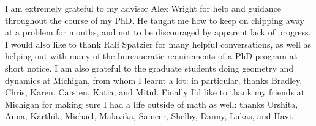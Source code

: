 
I am extremely grateful to my advisor Alex Wright for help and guidance throughout the course of my PhD.
He taught me how to keep on chipping away at a problem for months, and not to be discouraged by apparent lack of progress.
I would also like to thank Ralf Spatzier for many helpful conversations, as well as helping out with many of the bureaucratic requirements of a PhD program at short notice.
I am also grateful to the graduate students doing geometry and dynamics at Michigan, from whom I learnt a lot: in particular, thanks Bradley, Chris, Karen, Carsten, Katia, and Mitul.
Finally I'd like to thank my friends at Michigan for making sure I had a life outside of math as well: thanks Urshita, Anna, Karthik, Michael, Malavika, Sameer, Shelby, Danny, Lukas, and Havi.

